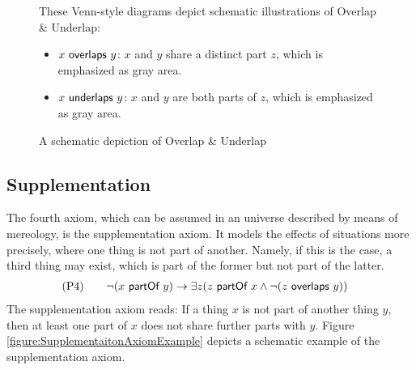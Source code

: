 \begin{figure}[h!]
\begin{center}
\hspace*{5mm}
\end{center}
{
\scriptsize 
These Venn-style diagrams depict schematic illustrations of Overlap \& Underlap:
\begin{itemize}
\item
$x ~\textsf{overlaps}~ y$:
$x$ and $y$ share a distinct part $z$, which is emphasized as gray area.
\item
$x ~\textsf{underlaps}~ y$:
$x$ and $y$ are both parts of $z$, which is emphasized as gray area.
\end{itemize}
}
\caption{A schematic depiction of Overlap \& Underlap}
\label{figure:SchematicOverlapAndUnderlap}
\end{figure}

\subsection{Supplementation}
\label{subsection:Supplementation}
The fourth axiom, which can be assumed in an universe described by means of mereology, is the supplementation axiom.
It models the effects of situations more precisely, where one thing is not part of another.
Namely, if this is the case, a third thing may exist, which is part of the former but not part of the latter.
\begin{align}
&\text{(P4)}
\qquad
\neg(x ~\textsf{partOf}~ y) \rightarrow \exists z (z ~\textsf{partOf}~ x \wedge \neg(z ~\textsf{overlaps}~ y))
\end{align}
The supplementation axiom reads:
If a thing $x$ is not part of another thing $y$, then at least one part of $x$ does not share further parts with $y$.
Figure \ref{figure:SupplementaitonAxiomExample} depicts a schematic example of the supplementation axiom.

